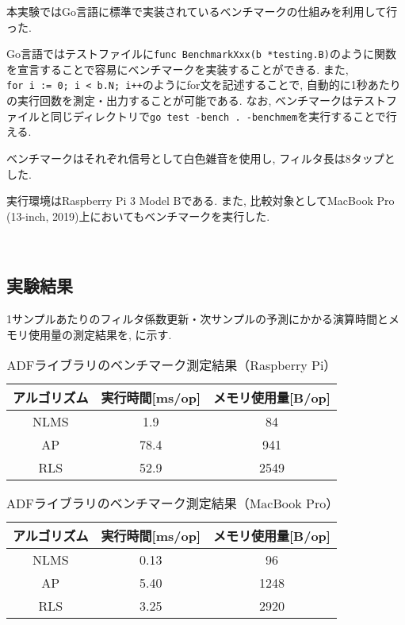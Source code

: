 本実験ではGo言語に標準で実装されているベンチマークの仕組みを利用して行った. 

Go言語ではテストファイルに\texttt{func\ BenchmarkXxx(b\ *testing.B)}のように関数を宣言することで容易にベンチマークを実装することができる. また, \texttt{for\ i\ :=\ 0;\ i\ \textless{}\ b.N;\ i++}のようにfor文を記述することで, 自動的に1秒あたりの実行回数を測定・出力することが可能である. なお, ベンチマークはテストファイルと同じディレクトリで\texttt{go\ test\ -bench\ .\ -benchmem}を実行することで行える. 


ベンチマークはそれぞれ信号として白色雑音を使用し, フィルタ長は8タップとした. 

実行環境はRaspberry Pi 3 Model Bである. また, 比較対象としてMacBook Pro (13-inch, 2019)上においてもベンチマークを実行した. 

\
\subsection{実験結果}\label{result-benchmark}

1サンプルあたりのフィルタ係数更新・次サンプルの予測にかかる演算時間とメモリ使用量の測定結果を, に示す. 

\begin{table}[H]
  \centering
  \caption{ADFライブラリのベンチマーク測定結果（Raspberry Pi）}
  \label{tab:benchmark_raspi}
  \begin{tabular}{|c|c|c|}
  \hline
  アルゴリズム & 実行時間{[}ms/op{]} & メモリ使用量{[}B/op{]} \\ \hline
  NLMS   & 1.9             & 84               \\ \hline
  AP     & 78.4            & 941              \\ \hline
  RLS    & 52.9            & 2549             \\ \hline
  \end{tabular}
\end{table}

\begin{table}[H]
  \centering
  \caption{ADFライブラリのベンチマーク測定結果（MacBook Pro）}
  \label{tab:benchmark_mac}
  \begin{tabular}{|c|c|c|}
  \hline
  アルゴリズム & 実行時間{[}ms/op{]} & メモリ使用量{[}B/op{]} \\ \hline
  NLMS   & 0.13            & 96               \\ \hline
  AP     & 5.40            & 1248             \\ \hline
  RLS    & 3.25            & 2920             \\ \hline
  \end{tabular}
\end{table}
\
